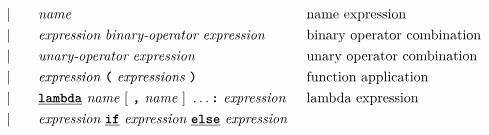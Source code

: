 \begin{alignat*}{9}
&&                       && |   &\quad &&  \textit{name}   && \textrm{name expression}\\
&&                       && |   &\quad &&  \textit{expression} \  \textit{binary-operator} \ 
                                            \textit{expression} \qquad
                                                           && \textrm{binary operator combination}\\
&&                       && |   &\quad &&   \textit{unary-operator} \ 
                                            \textit{expression}
                                                           && \textrm{unary operator combination}\\
&&                       && |   &\quad &&   \textit{expression} \ 
                                            \textbf{\texttt{(}}\ \textit{expressions}\
                                            \textbf{\texttt{)}}
                                                           && \textrm{function application}\\
&&                       && |   &\quad &&   \textbf{\texttt{\underline{lambda}}} \ 
                                            \textit{name} \ 
                                                   [\ \textbf{\texttt{,}} \ \textit{name}\ ]\ \ldots
                                            \texttt{\textbf{:}}\ \textit{expression}
                                                           && \textrm{lambda expression}\\
&&                       && |   &\quad &&   \textit{expression} \ \textbf{\texttt{\underline{if}}} \ \textit{expression} \ 
                                            \textbf{\texttt{\underline{else}}} \ \textit{expression} \ 

\end{alignat*}
